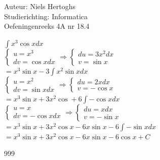 \documentclass[a4paper]{article}
\begin{document}
  
\noindent \large Auteur: Niels Hertoghs \\
\noindent \large Studierichting: Informatica\\
\noindent \large Oefeningenreeks 4A nr 18.4\\

\medskip
\normalsize

$\displaystyle\int x^3\cos xdx$\\

$
\left\{
\begin{array}{l}
u = x^3 \\
dv = \cos xdx
\end{array}
\right.
\Rightarrow
\left\{
\begin{array}{l}
du = 3x^2dx \\
v = \sin x
\end{array}
\right.
$\\

$= x^3 \sin x - 3 \displaystyle\int x^2 \sin x dx$\\

$
\left\{
\begin{array}{l}
u = x^2 \\
dv = \sin xdx
\end{array}
\right.
\Rightarrow
\left\{
\begin{array}{l}
du = 2xdx \\
v = -\cos x
\end{array}
\right.
$\\

$= x^3\sin x + 3 x^2 \cos + 6 \displaystyle\int - \cos x dx$\\

$
\left\{
\begin{array}{l}
u = x \\
dv = -\cos xdx
\end{array}
\right.
\Rightarrow
\left\{
\begin{array}{l}
du = xdx \\
v = -\sin x
\end{array}
\right.
$\\

$= x^3 \sin x + 3 x^2 \cos x - 6x \sin x - 6 \displaystyle\int - \sin x dx$\\

$= x^3 \sin x + 3 x^2 \cos x - 6x \sin x - 6 \cos x + C$\\

\begin{thebibliography}{999}
\end{thebibliography}
\end{document}
